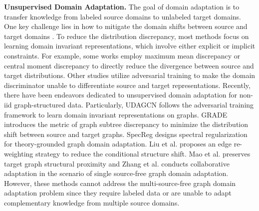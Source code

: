 \textbf{Unsupervised Domain Adaptation.} The goal of domain adaptation is to transfer knowledge from labeled source domains to unlabeled target domains. One key challenge lies in how to mitigate the domain shifts between source and target domains \cite{liu2024rethinking,liu2024revisiting}. To reduce the distribution discrepancy, most methods focus on learning domain invariant representations, which involve either explicit or implicit constraints. For example, some works \cite{long2015learning,zellinger2017central} employ maximum mean discrepancy or central moment discrepancy to directly reduce the divergence between source and target distributions. Other studies \cite{long2018conditional,hoffman2018cycada} utilize adversarial training to make the domain discriminator unable to differentiate source and target representations. Recently, there have been endeavors dedicated to unsupervised domain adaptation for non-iid graph-structured data. Particularly, UDAGCN \cite{wu2020unsupervised} follows the adversarial training framework to learn domain invariant representations on graphs. GRADE \cite{wu2023non} introduces the metric of graph subtree discrepancy to minimize the distribution shift between source and target graphs. SpecReg \cite{you2022graph} designs spectral regularization for theory-grounded graph domain adaptation. Liu et al. \cite{liu2023structural} proposes an edge re-weighting strategy to reduce the conditional structure shift. Mao et al. \cite{mao2021source} preserves target graph structural proximity and Zhang et al. \cite{zhang2024collaborate} conducts collaborative adaptation in the scenario of single source-free graph domain adaptation. However, these methods cannot address the multi-source-free graph domain adaptation problem since they require labeled data or are unable to adapt complementary knowledge from multiple source domains.

